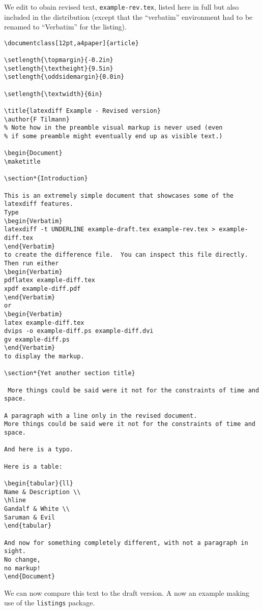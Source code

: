 \documentclass{article}
\begin{document}
We edit to obain revised text, \verb|example-rev.tex|, listed here in
full but also included in the distribution (except that the ``verbatim'' environment had
to be renamed to ``Verbatim'' for the listing).
{\scriptsize
\begin{verbatim}
\documentclass[12pt,a4paper]{article}

\setlength{\topmargin}{-0.2in}
\setlength{\textheight}{9.5in}
\setlength{\oddsidemargin}{0.0in}

\setlength{\textwidth}{6in}

\title{latexdiff Example - Revised version}
\author{F Tilmann}
% Note how in the preamble visual markup is never used (even
% if some preamble might eventually end up as visible text.)

\begin{Document}
\maketitle

\section*{Introduction}

This is an extremely simple document that showcases some of the latexdiff features.
Type
\begin{Verbatim}
latexdiff -t UNDERLINE example-draft.tex example-rev.tex > example-diff.tex
\end{Verbatim}
to create the difference file.  You can inspect this file directly. Then run either 
\begin{Verbatim}
pdflatex example-diff.tex
xpdf example-diff.pdf
\end{Verbatim}
or
\begin{Verbatim}
latex example-diff.tex
dvips -o example-diff.ps example-diff.dvi
gv example-diff.ps
\end{Verbatim}
to display the markup.

\section*{Yet another section title}

 More things could be said were it not for the constraints of time and space.

A paragraph with a line only in the revised document.  
More things could be said were it not for the constraints of time and space.

And here is a typo. 

Here is a table:

\begin{tabular}{ll}
Name & Description \\
\hline
Gandalf & White \\
Saruman & Evil
\end{tabular}

And now for something completely different, with not a paragraph in sight.
No change, 
no markup!
\end{Document}
\end{verbatim}
}
We can now compare
this text to the draft version.
\newpage
A now an example making use of the \lstinline|listings| package.
\end{document}
